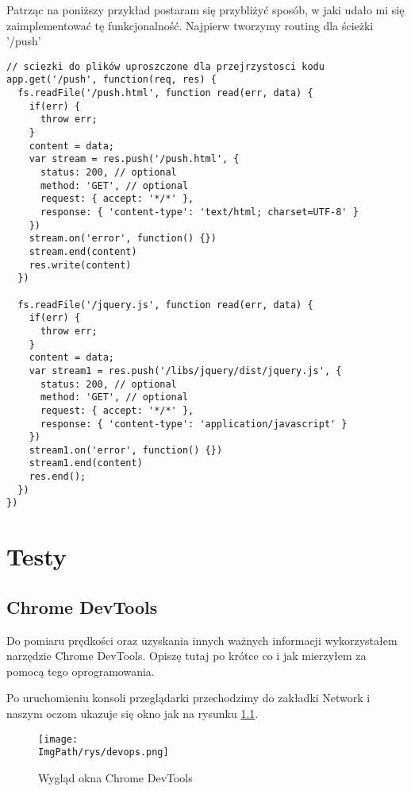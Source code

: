\documentclass[a4paper,12pt,twoside,openany]{report}
\newcommand{\ImgPath}{.}
\begin{document}
Patrząc na poniższy przykład postaram się przybliżyć sposób, w jaki udało mi się zaimplementować tę funkcjonalność.
Najpierw tworzymy routing dla ścieżki '/push'

\begin{lstlisting}
// sciezki do plików uproszczone dla przejrzystosci kodu
app.get('/push', function(req, res) {
  fs.readFile('/push.html', function read(err, data) {
    if(err) {
      throw err;
    }
    content = data;
    var stream = res.push('/push.html', {
      status: 200, // optional
      method: 'GET', // optional
      request: { accept: '*/*' },
      response: { 'content-type': 'text/html; charset=UTF-8' }
    })
    stream.on('error', function() {})
    stream.end(content)
    res.write(content)
  })

  fs.readFile('/jquery.js', function read(err, data) {
    if(err) {
      throw err;
    }
    content = data;
    var stream1 = res.push('/libs/jquery/dist/jquery.js', {
      status: 200, // optional
      method: 'GET', // optional
      request: { accept: '*/*' },
      response: { 'content-type': 'application/javascript' }
    })
    stream1.on('error', function() {})
    stream1.end(content)
    res.end();
  })
})
\end{lstlisting}

\chapter{Testy}

\section{Chrome DevTools}

Do pomiaru prędkości oraz uzyskania innych ważnych informacji wykorzystałem narzędzie Chrome DevTools.
Opiszę tutaj po krótce co i jak mierzyłem za pomocą tego oprogramowania.

Po uruchomieniu konsoli przeglądarki przechodzimy do zakładki Network i naszym oczom ukazuje się okno jak na rysunku \ref{schematDevops}.

\begin{figure}[!htbp]
	\begin{center}
\centering
\texttt{[image: \\ImgPath/rys/devops.png]}
\end{center}
	\caption{Wygląd okna Chrome DevTools}
	\label{schematDevops}
\end{figure}
\end{document}
